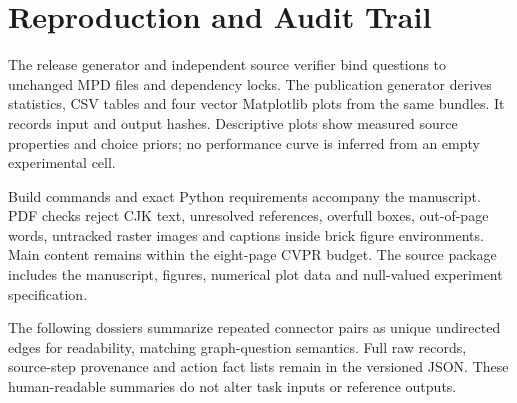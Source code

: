 \documentclass[10pt,letterpaper]{article}
\begin{document}
\begin{table}[h]
\centering\small
\caption{Unrun physical validation. Each row requires a declared unit
(pair, part, operation or assembly), sampling policy and acceptance
criterion. Counts cannot be pooled across procedures.}

\end{table}

\section{Reproduction and Audit Trail}
The release generator and independent source verifier bind questions
to unchanged MPD files and dependency locks. The publication generator
derives statistics, CSV tables and four vector Matplotlib plots from
the same bundles. It records input and output hashes. Descriptive
plots show measured source properties and choice priors; no performance
curve is inferred from an empty experimental cell.

Build commands and exact Python requirements accompany the manuscript.
PDF checks reject CJK text, unresolved references, overfull boxes,
out-of-page words, untracked raster images and captions inside brick
figure environments. Main content remains within the eight-page CVPR
budget. The source package includes the manuscript, figures, numerical
plot data and null-valued experiment specification.

The following dossiers summarize repeated connector pairs as unique
undirected edges for readability, matching graph-question semantics.
Full raw records, source-step provenance and action fact lists remain
in the versioned JSON. These human-readable summaries do not alter
task inputs or reference outputs.


\end{document}
